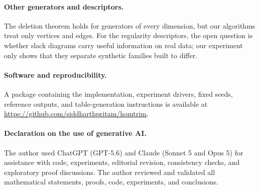 \documentclass[11pt,letterpaper]{article}
\theoremstyle{definition}
\begin{document}
\paragraph{Other generators and descriptors.}
The deletion theorem holds for generators of every dimension, but our
algorithms treat only vertices and edges. For the regularity descriptors, the
open question is whether slack diagrams carry useful information on real data;
our experiment only shows that they separate synthetic families built to
differ.

\paragraph{Software and reproducibility.}
A package containing the implementation, experiment drivers, fixed seeds,
reference outputs, and table-generation instructions is available at
\url{https://github.com/siddharthpritam/homtrim}.

\paragraph{Declaration on the use of generative AI.}
The author used ChatGPT (GPT-5.6) and Claude (Sonnet 5 and Opus 5) for
assistance with code, experiments, editorial revision, consistency checks, and
exploratory proof discussions. The author reviewed and validated all
mathematical statements, proofs, code, experiments, and conclusions.
\end{document}
